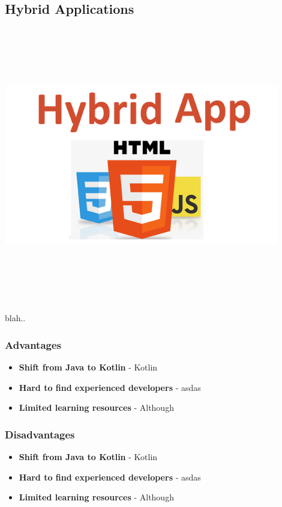 \subsection{Hybrid Applications}
\par
\medskip
\begin{center}
    \includegraphics[width=12cm,height=12cm,keepaspectratio]{Images/hybridapp.png}
\end{center}

blah..


\subsubsection{Advantages}
\begin{itemize}
    \item \textbf{Shift from Java to Kotlin} - Kotlin
    \item \textbf{Hard to find experienced developers} - asdas
    \item \textbf{Limited learning resources} - Although
\end{itemize}
\subsubsection{Disadvantages}
\begin{itemize}
    \item \textbf{Shift from Java to Kotlin} - Kotlin
    \item \textbf{Hard to find experienced developers} - asdas
    \item \textbf{Limited learning resources} - Although
\end{itemize}

